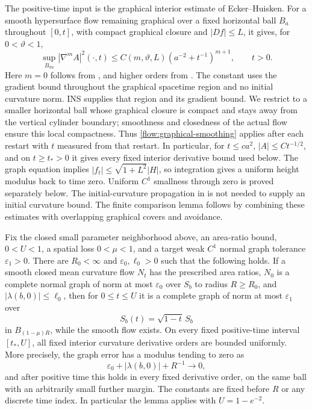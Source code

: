 The positive-time input is the graphical interior estimate of
Ecker--Huisken.  For a smooth hypersurface flow remaining graphical
over a fixed horizontal ball $B_a$ throughout $[0,t]$, with compact
graphical closure and $|Df|\le L$, it gives, for $0<\vartheta<1$,
\begin{equation}\label{flow:graphical-smoothing}
 \sup_{B_{\vartheta a}}|\nabla^m A|^2(\cdot,t)
 \le C(m,\vartheta,L)(a^{-2}+t^{-1})^{m+1},\qquad t>0.
\end{equation}
Here $m=0$ follows from
\cite[Corollary~3.2(ii)]{EckerHuisken1991}, and higher orders from
\cite[Theorem~3.4 and Corollary~3.5(ii)]{EckerHuisken1991}.
The constant uses the gradient bound throughout the graphical
spacetime region and no initial curvature norm.  INS supplies that
region and its gradient bound.  We restrict to a smaller horizontal
ball whose graphical closure is compact and stays away from the
vertical cylinder boundary; smoothness and closedness of the actual
flow ensure this local compactness.  Thus
\eqref{flow:graphical-smoothing} applies after each restart with
$t$ measured from that restart.  In particular, for $t\le c a^2$,
$|A|\le Ct^{-1/2}$, and on $t\ge t_*>0$ it gives every fixed
interior derivative bound used below.  The graph equation implies
$|f_t|\le\sqrt{1+L^2}|H|$, so integration gives a uniform height
modulus back to time zero.  Uniform $C^1$ smallness through zero is
proved separately below.  The initial-curvature propagation in
\cite[Remark~1.6(i)]{INS2019} is not needed to supply an initial
curvature bound.  The finite comparison lemma follows by combining
these estimates with overlapping graphical covers and avoidance.

\begin{lemma}\label{flow:propagation}
Fix the closed small parameter neighborhood above, an area-ratio
bound, $0<U<1$, a spatial loss $0<\mu<1$, and a target weak $C^1$
normal graph tolerance $\varepsilon_1>0$.  There are
$R_0<\infty$ and $\varepsilon_0,\ell_0>0$ such that the
following holds.  If a smooth closed mean curvature flow $N_t$
has the prescribed area ratios, $N_0$ is a complete normal graph
of norm at most $\varepsilon_0$ over $S_b$ to radius $R\ge R_0$,
and $|\lambda(b,0)|\le\ell_0$, then for $0\le t\le U$
it is a complete graph of norm at most $\varepsilon_1$ over
\[
 S_b(t)=\sqrt{1-t}\,S_b
\]
in $B_{(1-\mu)R}$, while the smooth flow exists.  On every fixed
positive-time interval $[t_*,U]$, all fixed interior curvature
derivative orders are bounded uniformly.  More precisely, the
graph error has a modulus tending to zero as
\[
 \varepsilon_0+|\lambda(b,0)|+R^{-1}\longrightarrow0,
\]
and after positive time this holds in every fixed derivative
order, on the same ball with an arbitrarily small further margin.
The constants are fixed before $R$ or any discrete time index.
In particular the lemma applies with $U=1-e^{-2}$.
\end{lemma}

